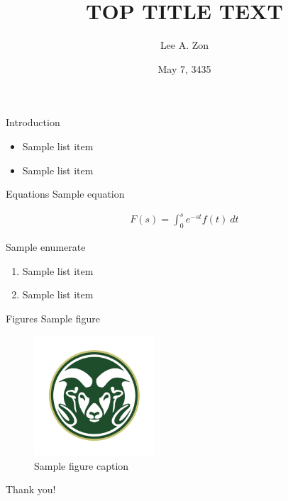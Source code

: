 \documentclass[xcolor=dvipsnames]{beamer}
\title[BOTTOM TITLE TEXT] %
{
      \textbf{TOP TITLE TEXT}
}
\author[(AUTHOR BOTTOM NAME)] %
{
      Lee A. Zon
}
\institute[Colorado State University]
{
      Colorado State University
}
\date{May 7, 3435}
\begin{document}
\begin{frame}
  \titlepage
\end{frame}

\begin{frame}{Introduction}
  \lipsum[1]

  \begin{itemize}
    \item Sample list item
    \item Sample list item
  \end{itemize}
\end{frame}

\begin{frame}{Equations}
  Sample equation

  \begin{align}
    F(s) = \int_0^s e^{-st} f(t) \ dt
  \end{align}
  
  Sample enumerate
  \begin{enumerate}
    \item Sample list item
    \item Sample list item
  \end{enumerate}
\end{frame}

\begin{frame}{Figures}
  Sample figure

  \begin{figure}
    \centering
    \includegraphics[width=0.4\textwidth]{../Handwerk/figures/1.jpg}
    \caption{Sample figure caption}
    \label{fig:test_figure}
  \end{figure}
\end{frame}

\begin{frame}{Thank you!}

\end{frame}
\end{document}
